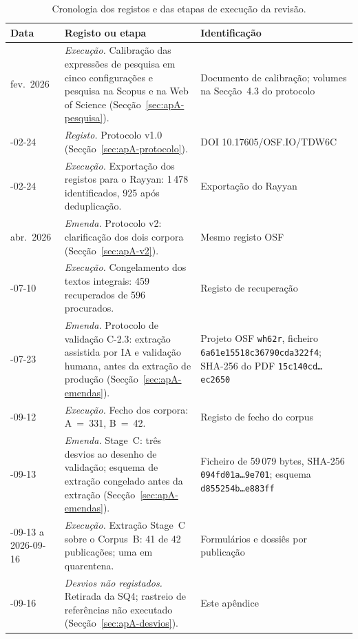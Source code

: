 \begin{table}[H]
\centering\small
\caption{Cronologia dos registos e das etapas de execução da revisão.}
\label{tab:apA-cronologia}
\ntzebra
\begin{tabularx}{\linewidth}{@{}>{\raggedright\arraybackslash}p{2.1cm}>{\raggedright\arraybackslash}X>{\raggedright\arraybackslash}p{3.9cm}@{}}
\toprule
\textbf{Data}  &  \textbf{Registo ou etapa}  &  \textbf{Identificação} \\
\midrule
fev.\ 2026 & \emph{Execução.} Calibração das expressões de pesquisa em cinco configurações e pesquisa na Scopus e na Web of Science (Secção~\ref{sec:apA-pesquisa}). & Documento de calibração; volumes na Secção~4.3 do protocolo \\
2026-02-24 & \emph{Registo.} Protocolo v1.0 (Secção~\ref{sec:apA-protocolo}). & DOI 10.17605/OSF.IO/TDW6C \\
2026-02-24 & \emph{Execução.} Exportação dos registos para o Rayyan: 1\,478 identificados, 925 após deduplicação. & Exportação do Rayyan \\
abr.\ 2026 & \emph{Emenda.} Protocolo v2: clarificação dos dois corpora (Secção~\ref{sec:apA-v2}). & Mesmo registo OSF \\
2026-07-10 & \emph{Execução.} Congelamento dos textos integrais: 459 recuperados de 596 procurados. & Registo de recuperação \\
2026-07-23 & \emph{Emenda.} Protocolo de validação C-2.3: extração assistida por IA e validação humana, antes da extração de produção (Secção~\ref{sec:apA-emendas}). & Projeto OSF \texttt{wh62r}, ficheiro \texttt{6a61e155\allowbreak 18c36790\allowbreak cda322f4}; SHA-256 do PDF \texttt{15c140cd\ldots ec2650} \\
2026-09-12 & \emph{Execução.} Fecho dos corpora: A~=~331, B~=~42. & Registo de fecho do corpus \\
2026-09-13 & \emph{Emenda.} Stage~C: três desvios ao desenho de validação; esquema de extração congelado antes da extração (Secção~\ref{sec:apA-emendas}). & Ficheiro de 59\,079 bytes, SHA-256 \texttt{094fd01a\ldots 9e701}; esquema \texttt{d855254b\ldots e883ff} \\
2026-09-13 a 2026-09-16 & \emph{Execução.} Extração Stage~C sobre o Corpus~B: 41 de 42 publicações; uma em quarentena. & Formulários e dossiês por publicação \\
2026-09-16 & \emph{Desvios não registados.} Retirada da SQ4; rastreio de referências não executado (Secção~\ref{sec:apA-desvios}). & Este apêndice \\
\bottomrule
\end{tabularx}
\end{table}

